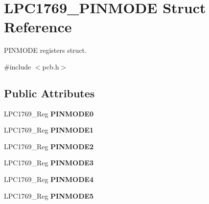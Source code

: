 \hypertarget{struct_l_p_c1769___p_i_n_m_o_d_e}{\section{L\+P\+C1769\+\_\+\+P\+I\+N\+M\+O\+D\+E Struct Reference}
\label{struct_l_p_c1769___p_i_n_m_o_d_e}
}


P\+I\+N\+M\+O\+D\+E registers struct.  




{\ttfamily \#include $<$pcb.\+h$>$}

\subsection*{Public Attributes}
\begin{DoxyCompactItemize}
\item 
\hypertarget{struct_l_p_c1769___p_i_n_m_o_d_e_a1c12175661dbf8c5b352730468d92df6}{L\+P\+C1769\+\_\+\+Reg {\bfseries P\+I\+N\+M\+O\+D\+E0}}\label{struct_l_p_c1769___p_i_n_m_o_d_e_a1c12175661dbf8c5b352730468d92df6}

\item 
\hypertarget{struct_l_p_c1769___p_i_n_m_o_d_e_af704288f13d306e396a2ec94e3e4fac9}{L\+P\+C1769\+\_\+\+Reg {\bfseries P\+I\+N\+M\+O\+D\+E1}}\label{struct_l_p_c1769___p_i_n_m_o_d_e_af704288f13d306e396a2ec94e3e4fac9}

\item 
\hypertarget{struct_l_p_c1769___p_i_n_m_o_d_e_a662b46134622ab318190677766a8a46f}{L\+P\+C1769\+\_\+\+Reg {\bfseries P\+I\+N\+M\+O\+D\+E2}}\label{struct_l_p_c1769___p_i_n_m_o_d_e_a662b46134622ab318190677766a8a46f}

\item 
\hypertarget{struct_l_p_c1769___p_i_n_m_o_d_e_a1e0ecec1e76f240f37bd1d5784256ae1}{L\+P\+C1769\+\_\+\+Reg {\bfseries P\+I\+N\+M\+O\+D\+E3}}\label{struct_l_p_c1769___p_i_n_m_o_d_e_a1e0ecec1e76f240f37bd1d5784256ae1}

\item 
\hypertarget{struct_l_p_c1769___p_i_n_m_o_d_e_af6feaf7b1a07f20ad12f1ddc71d8ff8d}{L\+P\+C1769\+\_\+\+Reg {\bfseries P\+I\+N\+M\+O\+D\+E4}}\label{struct_l_p_c1769___p_i_n_m_o_d_e_af6feaf7b1a07f20ad12f1ddc71d8ff8d}

\item 
\hypertarget{struct_l_p_c1769___p_i_n_m_o_d_e_a7198aed92e17fe3a76ab4da20f1b8a26}{L\+P\+C1769\+\_\+\+Reg {\bfseries P\+I\+N\+M\+O\+D\+E5}}\label{struct_l_p_c1769___p_i_n_m_o_d_e_a7198aed92e17fe3a76ab4da20f1b8a26}


\end{DoxyCompactItemize}

